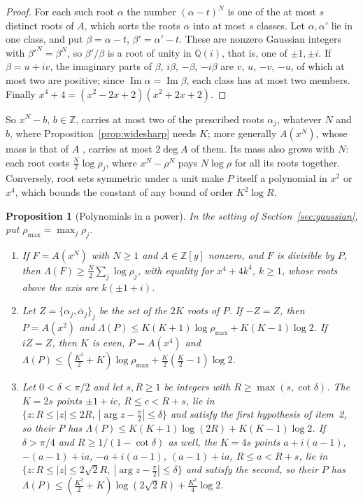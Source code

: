 \documentclass[11pt]{article}
\newtheorem{proposition}[theorem]{Proposition}
\begin{document}
\begin{proof}
For each such root $\alpha$ the number $(\alpha-t)^N$ is one of the at most $s$
distinct roots of $A$, which sorts the roots $\alpha$ into at most $s$ classes.
Let $\alpha,\alpha'$ lie in one class, and put $\beta=\alpha-t$,
$\beta'=\alpha'-t$.  These are nonzero Gaussian integers with
$\beta'^N=\beta^N$, so $\beta'/\beta$ is a root of unity in $\mathbb Q(i)$,
that is, one of $\pm1,\pm i$.  If $\beta=u+iv$, the imaginary parts of $\beta$,
$i\beta$, $-\beta$, $-i\beta$ are $v$, $u$, $-v$, $-u$, of which at most two are
positive; since $\operatorname{Im}\alpha=\operatorname{Im}\beta$, each class has
at most two members.  Finally $x^4+4=(x^2-2x+2)(x^2+2x+2)$.
\end{proof}

So $x^N-b$, $b\in\mathbb Z$, carries at most two of the prescribed roots
$\alpha_j$, whatever $N$ and $b$, where Proposition~\ref{prop:widesharp} needs
$K$; more generally $A(x^N)$, whose mass is that of $A$
\cite[Theorem~2.2]{coefficient-mass-complex}, carries at most $2\deg A$ of them.
Its mass also grows with $N$: each root costs $\frac N2\log\rho_j$, where
$x^N-\rho^N$ pays $N\log\rho$ for all its roots together.  Conversely,
root sets symmetric under a unit make $P$ itself a polynomial in $x^2$ or
$x^4$, which bounds the constant of any bound of order $K^2\log R$.

\begin{proposition}[Polynomials in a power]\label{prop:gausspower}
In the setting of Section~\ref{sec:gaussian}, put $\rho_{\max}=\max_j\rho_j$.
\begin{enumerate}
\item If $F=A(x^N)$ with $N\ge1$ and $A\in\mathbb Z[y]$ nonzero, and $F$ is
divisible by $P$, then $\Lambda(F)\ge\frac N2\sum_j\log\rho_j$, with equality
for $x^4+4k^4$, $k\ge1$, whose roots above the axis are $k(\pm1+i)$.
\item Let $Z=\{\alpha_j,\bar\alpha_j\}_j$ be the set of the $2K$ roots of $P$.
If $-Z=Z$, then $P=A(x^2)$ and
$\Lambda(P)\le K(K+1)\log\rho_{\max}+K(K-1)\log2$.  If $iZ=Z$, then $K$ is even,
$P=A(x^4)$ and
$\Lambda(P)\le(\frac{K^2}2+K)\log\rho_{\max}+\frac K2(\frac K2-1)\log2$.
\item Let $0<\delta<\pi/2$ and let $s,R\ge1$ be integers with
$R\ge\max(s,\cot\delta)$.  The $K=2s$ points $\pm1+ic$, $R\le c<R+s$, lie in
$\{z:R\le|z|\le2R,\ |\arg z-\frac\pi2|\le\delta\}$ and satisfy the first
hypothesis of item~2, so their $P$ has
$\Lambda(P)\le K(K+1)\log(2R)+K(K-1)\log2$.  If $\delta>\pi/4$ and
$R\ge1/(1-\cot\delta)$ as well, the $K=4s$ points $a+i(a-1)$, $-(a-1)+ia$,
$-a+i(a-1)$, $(a-1)+ia$, $R\le a<R+s$, lie in
$\{z:R\le|z|\le2\sqrt2R,\ |\arg z-\frac\pi2|\le\delta\}$ and satisfy the
second, so their $P$ has
$\Lambda(P)\le(\frac{K^2}2+K)\log(2\sqrt2R)+\frac{K^2}4\log2$.
\end{enumerate}
\end{proposition}
\end{document}
